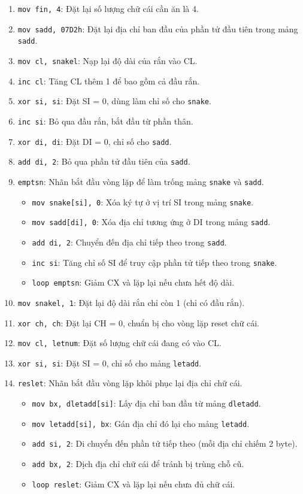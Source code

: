 \documentclass[12pt]{article}
\begin{document}
\begin{enumerate}[label=\textbf{\arabic*.}]
    \item \texttt{mov fin, 4}: Đặt lại số lượng chữ cái cần ăn là 4.
    \item \texttt{mov sadd, 07D2h}: Đặt lại địa chỉ ban đầu của phần tử đầu tiên trong mảng \texttt{sadd}.
    \item \texttt{mov cl, snakel}: Nạp lại độ dài của rắn vào CL.
    \item \texttt{inc cl}: Tăng CL thêm 1 để bao gồm cả đầu rắn.
    \item \texttt{xor si, si}: Đặt SI = 0, dùng làm chỉ số cho \texttt{snake}.
    \item \texttt{inc si}: Bỏ qua đầu rắn, bắt đầu từ phần thân.
    \item \texttt{xor di, di}: Đặt DI = 0, chỉ số cho \texttt{sadd}.
    \item \texttt{add di, 2}: Bỏ qua phần tử đầu tiên của \texttt{sadd}.
    \item \texttt{emptsn}: Nhãn bắt đầu vòng lặp để làm trống mảng \texttt{snake} và \texttt{sadd}.
    \begin{itemize}
        \item \texttt{mov snake[si], 0}: Xóa ký tự ở vị trí SI trong mảng \texttt{snake}.
        \item \texttt{mov sadd[di], 0}: Xóa địa chỉ tương ứng ở DI trong mảng \texttt{sadd}.
        \item \texttt{add di, 2}: Chuyển đến địa chỉ tiếp theo trong \texttt{sadd}.
        \item \texttt{inc si}: Tăng chỉ số SI để truy cập phần tử tiếp theo trong \texttt{snake}.
        \item \texttt{loop emptsn}: Giảm CX và lặp lại nếu chưa hết độ dài.
    \end{itemize}
    
    \item \texttt{mov snakel, 1}: Đặt lại độ dài rắn chỉ còn 1 (chỉ có đầu rắn).
    \item \texttt{xor ch, ch}: Đặt lại CH = 0, chuẩn bị cho vòng lặp reset chữ cái.
    \item \texttt{mov cl, letnum}: Đặt số lượng chữ cái đang có vào CL.
    \item \texttt{xor si, si}: Đặt SI = 0, chỉ số cho mảng \texttt{letadd}.
    \item \texttt{reslet}: Nhãn bắt đầu vòng lặp khôi phục lại địa chỉ chữ cái.
    \begin{itemize}
        \item \texttt{mov bx, dletadd[si]}: Lấy địa chỉ ban đầu từ mảng \texttt{dletadd}.
        \item \texttt{mov letadd[si], bx}: Gán địa chỉ đó lại cho mảng \texttt{letadd}.
        \item \texttt{add si, 2}: Di chuyển đến phần tử tiếp theo (mỗi địa chỉ chiếm 2 byte).
        \item \texttt{add bx, 2}: Dịch địa chỉ chữ cái để tránh bị trùng chỗ cũ.
        \item \texttt{loop reslet}: Giảm CX và lặp lại nếu chưa đủ chữ cái.
    \end{itemize}
    

\end{enumerate}
\end{document}
